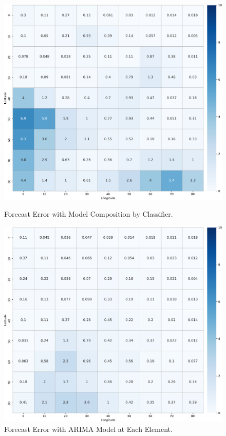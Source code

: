 \begin{figure}[!tbp]
  \centering
  \begin{minipage}[b]{0.45\textwidth}
    \includegraphics[width=\textwidth]{../Figures/query_10x10_solver-multiclass-1000dpi}
    \caption{Forecast Error with Model Composition by Classifier.}
    \label{Fig:model_composition_classifier}
  \end{minipage}
  \hfill
  \begin{minipage}[b]{0.45\textwidth}
    \includegraphics[width=\textwidth]{../Figures/query_10x10_solver-each-1000dpi}
    \caption{Forecast Error with ARIMA Model at Each Element.}
    \label{Fig:model_composition_each}
  \end{minipage}
\end{figure}

